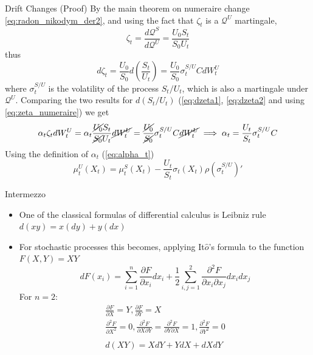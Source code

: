 \documentclass{beamer}
\begin{document}
\begin{frame}{Drift Changes (Proof)}
  By the main theorem on numeraire change \cref{eq:radon_nikodym_der2}, and using the fact that $\zeta_t$ is a $\mathcal{Q}^U$ martingale, 
  \begin{equation}
    \zeta_t = \frac{d\mathcal{Q}^S}{d\mathcal{Q}^U} = \frac{U_0S_t}{S_0U_t}
    \label{eq:zeta_numeraire}
  \end{equation}
  thus
  \begin{equation}
    d\zeta_t= \frac{U_0}{S_0}d\left(\frac{S_t}{U_t}\right)= \frac{U_0}{S_0}\sigma_t^{S/U}CdW_t^U
    \label{eq:dzeta2}
  \end{equation}
  where $\sigma^{S/U}_t$ is the volatility of the process $S_t/U_t$, which is also a martingale under $\mathcal{Q}^U$. \pause Comparing the two results for $d(S_t/U_t)$ (\cref{eq:dzeta1}, \cref{eq:dzeta2} and using \cref{eq:zeta_numeraire}) we get
  \begin{equation}
    \begin{gathered}
      \alpha_t\zeta_tdW_t^U = \alpha_t\frac{\cancel{U_0}S_t}{\cancel{S_0}U_t}\cancel{dW_t^U}=	\frac{\cancel{U_0}}{\cancel{S_0}}\sigma^{S/U}_tC\cancel{dW_t^U} \implies 
      \alpha_t = \frac{U_t}{S_t}\sigma^{S/U}_tC
    \end{gathered}
  \end{equation}
  \pause
  Using the definition of $\alpha_t$ (\cref{eq:alpha_t})
\begin{equation}
	\mu_t^U(X_t)=\mu_t^S(X_t)-\frac{U_t}{S_t}\sigma_t(X_t)\rho(\sigma^{S/U}_t)'
	\label{eq:alpha}
\end{equation}
\end{frame}

\begin{frame}{Intermezzo}
  \begin{itemize}
  \item One of the classical formulas of differential calculus is Leibniz rule $d(x y) = x(dy) + y(dx)$
  \item For stochastic processes this becomes, applying It$\hat{o}$'s formula to the function $F(X,Y) = XY$
    \begin{equation*}
      dF(x_i)=\sum_{i=1}^n \frac{\partial F}{\partial x_i}dx_i
      +\frac{1}{2}\sum_{i,j=1}^2 \frac{\partial^2 F}{\partial x_i \partial x_j}dx_i dx_j
    \end{equation*}
  For $n=2$:
    \begin{equation*}
      \begin{gathered}
        \frac{\partial F}{\partial X}=Y,\frac{\partial F}{\partial Y}=X \\
        \frac{\partial^2 F}{\partial X^2}=0,\frac{\partial^2 F}{\partial X\partial Y}=\frac{\partial^2 F}{\partial Y\partial X}=1,\frac{\partial^2 F}{\partial Y^2}=0\\
        \\
        d(XY) = XdY + YdX + dXdY
      \end{gathered}
    \end{equation*}
  \end{itemize}
\end{frame}
\end{document}
